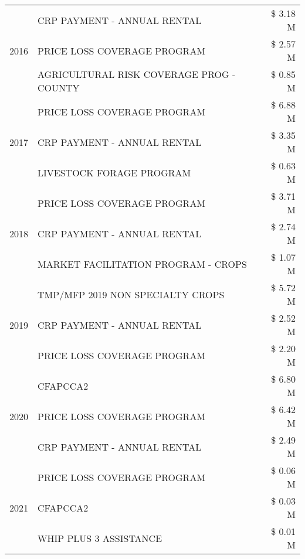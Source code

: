 \begin{tabular}{llr}
\multirow[t]{3}{*}{2016} & CRP PAYMENT - ANNUAL RENTAL & \$ 3.18 M \\
 & PRICE LOSS COVERAGE PROGRAM & \$ 2.57 M \\
 & AGRICULTURAL RISK COVERAGE PROG - COUNTY & \$ 0.85 M \\
\cline{1-3}
\multirow[t]{3}{*}{2017} & PRICE LOSS COVERAGE PROGRAM & \$ 6.88 M \\
 & CRP PAYMENT - ANNUAL RENTAL & \$ 3.35 M \\
 & LIVESTOCK FORAGE PROGRAM & \$ 0.63 M \\
\cline{1-3}
\multirow[t]{3}{*}{2018} & PRICE LOSS COVERAGE PROGRAM & \$ 3.71 M \\
 & CRP PAYMENT - ANNUAL RENTAL & \$ 2.74 M \\
 & MARKET FACILITATION PROGRAM - CROPS & \$ 1.07 M \\
\cline{1-3}
\multirow[t]{3}{*}{2019} & TMP/MFP 2019 NON SPECIALTY CROPS & \$ 5.72 M \\
 & CRP PAYMENT - ANNUAL RENTAL & \$ 2.52 M \\
 & PRICE LOSS COVERAGE PROGRAM & \$ 2.20 M \\
\cline{1-3}
\multirow[t]{3}{*}{2020} & CFAPCCA2 & \$ 6.80 M \\
 & PRICE LOSS COVERAGE PROGRAM & \$ 6.42 M \\
 & CRP PAYMENT - ANNUAL RENTAL & \$ 2.49 M \\
\cline{1-3}
\multirow[t]{3}{*}{2021} & PRICE LOSS COVERAGE PROGRAM & \$ 0.06 M \\
 & CFAPCCA2 & \$ 0.03 M \\
 & WHIP PLUS 3 ASSISTANCE & \$ 0.01 M \\
\cline{1-3}
\bottomrule
\end{tabular}
